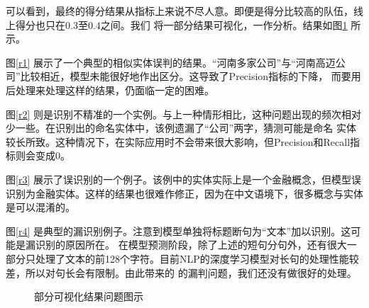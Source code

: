 \documentclass[11pt]{article}
\begin{document}
可以看到，最终的得分结果从指标上来说不尽人意。即便是得分比较高的队伍，线上得分也只在$0.3$至$0.4$之间。我们%
将一部分结果可视化，一作分析。结果如图\ref{results} 所示。\par
图\ref{r1} 展示了一个典型的相似实体误判的结果。“河南多家公司”与“河南高迈公司”比较相近，模型未能很好地作出区分。这导致了Precision指标的下降，%
而要用后处理来处理这样的结果，仍面临一定的困难。\par
图\ref{r2} 则是识别不精准的一个实例。与上一种情形相比，这种问题出现的频次相对少一些。在识别出的命名实体中，该例遗漏了“公司”两字，猜测可能是命名%
实体较长所致。这种情况下，在实际应用时不会带来很大影响，但Precision和Recall指标则会变成0。\par
图\ref{r3} 展示了误识别的一个例子。该例中的实体实际上是一个金融概念，但模型误识别为金融实体。这样的结果也很难作修正，因为在中文语境下，很多概念与实体是可以混淆的。\par%
图\ref{r4} 是典型的漏识别例子。注意到模型单独将标题断句为“文本”加以识别。这可能是漏识别的原因所在。
在模型预测阶段，除了上述的短句分句外，还有很大一部分只处理了文本的前128个字符。目前NLP的深度学习模型对长句的处理性能较差，所以对句长会有限制。由此带来的%
的漏判问题，我们还没有做很好的处理。

\vspace{-4mm}
\begin{figure}[!ht]
    \centering



    \vspace{-3mm}
    \caption{部分可视化结果问题图示{\label{H}}}
    \label{results}
\end{figure}
\end{document}

